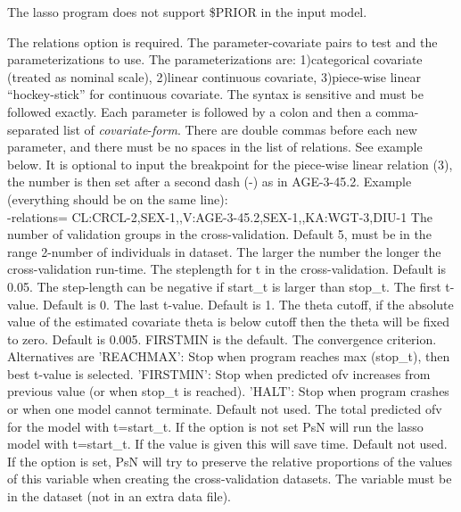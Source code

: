 The lasso program does not support \$PRIOR in the input model.

\begin{optionlist}
The relations option is required. The parameter-covariate pairs to test and the parameterizations to use. The parameterizations are: 1)categorical covariate (treated as nominal scale), 2)linear continuous covariate, 3)piece-wise linear “hockey-stick” for continuous covariate. The syntax is sensitive and must be followed exactly. Each parameter
is followed by a colon and then a comma-separated list of \emph{covariate}-\emph{form}. There are double commas
before each new parameter, and there must be no spaces in the list of relations.  
See example below.
It is optional to input the breakpoint for the piece-wise linear relation (3), the number is then set after a second dash (-) as in AGE-3-45.2. Example (everything should be on the same line):\\
-relations= CL:CRCL-2,SEX-1,,V:AGE-3-45.2,SEX-1,,KA:WGT-3,DIU-1
\nextopt
{}
The number of validation groups in the cross-validation. Default 5, must be in the range 2-number of individuals in dataset. The larger the number the longer the cross-validation run-time. 
\nextopt
{}
The steplength for t in the cross-validation. Default is 0.05. The step-length can be negative if start\_t is larger than stop\_t. 
\nextopt
{}
The first t-value. Default is 0. 
\nextopt
{}
The last t-value. Default is 1. 
\nextopt
{}
The theta cutoff, if the absolute value of the estimated covariate theta is below cutoff then the theta will be fixed to zero. Default is 0.005. 
\nextopt
{}
FIRSTMIN is the default. The convergence criterion. Alternatives are 'REACHMAX': Stop when program reaches max (stop\_t), then best t-value is selected. 'FIRSTMIN': Stop when predicted ofv increases from previous value (or when stop\_t is reached). 'HALT': Stop when program crashes or when one model cannot terminate. 
\nextopt
{}
Default not used. The total predicted ofv for the model with t=start\_t.  If the option is not set PsN will run the lasso model with t=start\_t. If the value is given this will save time. 
\nextopt
{}
Default not used. If the option is set, PsN will try to preserve the relative proportions of the values of this variable when creating the cross-validation datasets. The variable must be in the dataset (not in an extra data file). 

\end{optionlist}
